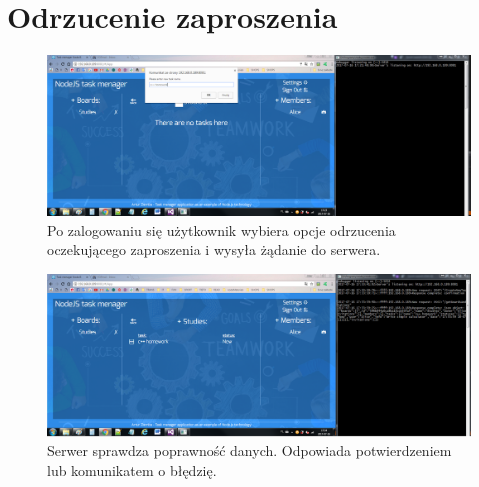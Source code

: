 \documentclass[12pt]{report}
\begin{document}
\section{Odrzucenie zaproszenia}
\begin{figure}[!hb]
\centering
\includegraphics[width=\textwidth,height=\textheight,keepaspectratio]{A1.png}
\captionsetup{labelformat=empty}
\caption[]{Po zalogowaniu się użytkownik wybiera opcje odrzucenia oczekującego zaproszenia i wysyła żądanie do serwera.}
\end{figure}
\begin{figure}[!hb]
\centering
\includegraphics[width=\textwidth,height=\textheight,keepaspectratio]{A2.png}
\captionsetup{labelformat=empty}
\caption[]{Serwer sprawdza poprawność danych. Odpowiada potwierdzeniem lub komunikatem o błędzię.}
\end{figure}
\end{document}
